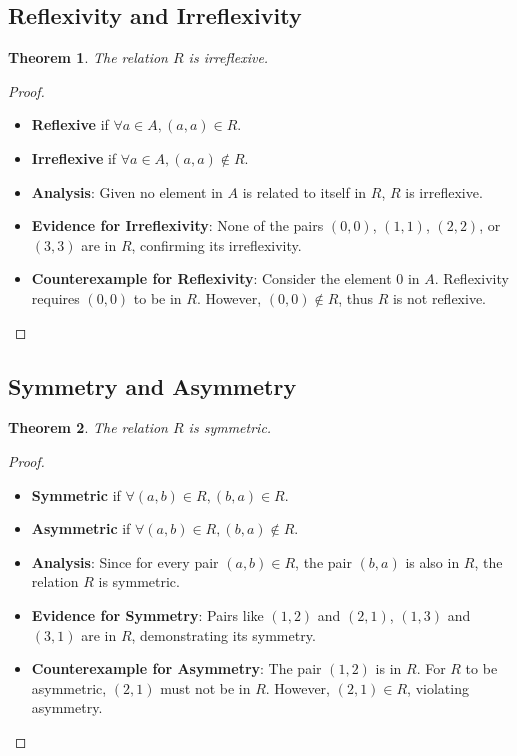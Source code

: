 \documentclass[12pt]{article}
\newtheorem{theorem}{Theorem}
\begin{document}
\subsection{Reflexivity and Irreflexivity}
\begin{theorem}
The relation \( R \) is irreflexive.
\end{theorem}
\begin{proof}
\begin{itemize}
    \item \textbf{Reflexive} if \(\forall a \in A, (a, a) \in R\).
    \item \textbf{Irreflexive} if \(\forall a \in A, (a, a) \notin R\).
    \item \textbf{Analysis}: Given no element in \( A \) is related to itself in \( R \), \( R \) is irreflexive.
    \item \textbf{Evidence for Irreflexivity}: None of the pairs \( (0,0) \), \( (1,1) \), \( (2,2) \), or \( (3,3) \) are in \( R \), confirming its irreflexivity.
    \item \textbf{Counterexample for Reflexivity}: Consider the element \( 0 \) in \( A \). Reflexivity requires \( (0,0) \) to be in \( R \). However, \( (0,0) \notin R \), thus \( R \) is not reflexive.
\end{itemize}
\end{proof}

\subsection{Symmetry and Asymmetry}
\begin{theorem}
The relation \( R \) is symmetric.
\end{theorem}
\begin{proof}
\begin{itemize}
    \item \textbf{Symmetric} if \(\forall (a, b) \in R, (b, a) \in R\).
    \item \textbf{Asymmetric} if \(\forall (a, b) \in R, (b, a) \notin R\).
    \item \textbf{Analysis}: Since for every pair \((a, b) \in R\), the pair \((b, a)\) is also in \( R \), the relation \( R \) is symmetric.
    \item \textbf{Evidence for Symmetry}: Pairs like \( (1,2) \) and \( (2,1) \), \( (1,3) \) and \( (3,1) \) are in \( R \), demonstrating its symmetry.
    \item \textbf{Counterexample for Asymmetry}: The pair \( (1,2) \) is in \( R \). For \( R \) to be asymmetric, \( (2,1) \) must not be in \( R \). However, \( (2,1) \in R \), violating asymmetry.
\end{itemize}
\end{proof}
\end{document}
